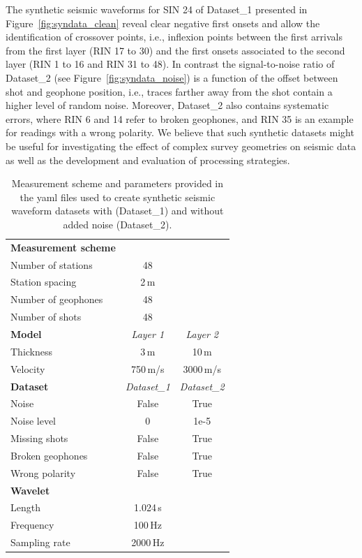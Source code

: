 \documentclass[a4paper,fleqn]{cas-sc}
\begin{document}
The synthetic seismic waveforms for SIN 24 of Dataset\_1 presented in Figure~\ref{fig:syndata_clean} reveal clear negative first onsets and allow the identification of crossover points, i.e., inflexion points between the first arrivals from the first layer (RIN 17 to 30) and the first onsets associated to the second layer (RIN 1 to 16 and RIN 31 to 48). 
In contrast the signal-to-noise ratio of Dataset\_2 (see Figure~\ref{fig:syndata_noise}) is a function of the offset between shot and geophone position, i.e., traces farther away from the shot contain a higher level of random noise. 
Moreover, Dataset\_2 also contains systematic errors, where RIN 6 and 14 refer to broken geophones, and RIN 35 is an example for readings with a wrong polarity.
We believe that such synthetic datasets might be useful for investigating the effect of complex survey geometries on seismic data as well as the development and evaluation of processing strategies.
\begin{table}[pos=h]
    \caption{Measurement scheme and parameters provided in the yaml files used to create synthetic seismic waveform datasets with (Dataset\_1) and without added noise (Dataset\_2).}
    \centering
    \begin{tabular}{lcc}
        \toprule
        \textbf{Measurement scheme} & & \\
        Number of stations & 48 & \\
        Station spacing & 2\,m & \\
        Number of geophones & 48 & \\
        Number of shots & 48 & \\
        \midrule
        \textbf{Model} & \textit{Layer 1} & \textit{Layer 2} \\
		Thickness & 3\,m & 10\,m \\
        Velocity & 750\,m/s & 3000\,m/s \\
        \midrule
        \textbf{Dataset} & \textit{Dataset\_1} & \textit{Dataset\_2} \\
		Noise & False & True \\
		Noise level & 0 & 1e-5 \\
		Missing shots & False & True \\
		Broken geophones & False & True \\
		Wrong polarity & False & True \\
		\midrule
		\textbf{Wavelet} & & \\
		Length & 1.024\,s & \\
		Frequency & 100\,Hz & \\
		Sampling rate & 2000\,Hz & \\
        \bottomrule
    \end{tabular}
    \label{tab:syndata}
\end{table}
\end{document}
